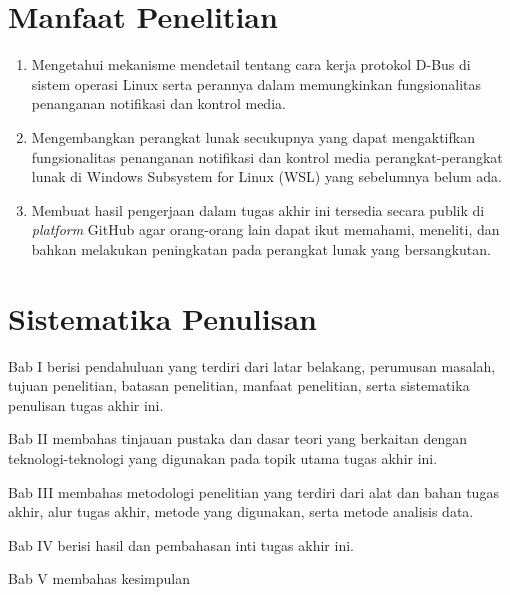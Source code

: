\section{Manfaat Penelitian}

\begin{enumerate}
    \item Mengetahui mekanisme mendetail tentang cara kerja protokol D-Bus di sistem operasi Linux serta perannya dalam memungkinkan fungsionalitas penanganan notifikasi dan kontrol media.

    \item Mengembangkan perangkat lunak secukupnya yang dapat mengaktifkan fungsionalitas penanganan notifikasi dan kontrol media perangkat-perangkat lunak di Windows Subsystem for Linux (WSL) yang sebelumnya belum ada.

    \item Membuat hasil pengerjaan dalam tugas akhir ini tersedia secara publik di \textit{platform} GitHub agar orang-orang lain dapat ikut memahami, meneliti, dan bahkan melakukan peningkatan pada perangkat lunak yang bersangkutan.
\end{enumerate}

\section{Sistematika Penulisan}

\noindent Bab I berisi pendahuluan yang terdiri dari latar belakang, perumusan masalah, tujuan penelitian, batasan penelitian, manfaat penelitian, serta sistematika penulisan tugas akhir ini.

\noindent Bab II membahas tinjauan pustaka dan dasar teori yang berkaitan dengan teknologi-teknologi yang digunakan pada topik utama tugas akhir ini.

\noindent Bab III membahas metodologi penelitian yang terdiri dari alat dan bahan tugas akhir, alur tugas akhir, metode yang digunakan, serta metode analisis data.

\noindent Bab IV berisi hasil dan pembahasan inti tugas akhir ini.

\noindent Bab V membahas kesimpulan

